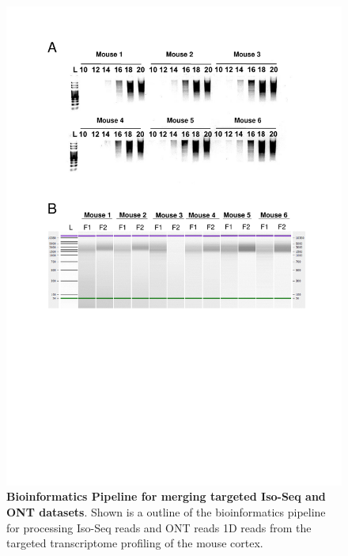 \begin{figure}[htp]
	\centering
	\includegraphics[page=5,trim={0.5cm 7cm 0cm 0cm},clip,scale = 0.8]{Figures/TargetedTranscriptome_LabResults}
	\captionsetup{width=0.95\textwidth,singlelinecheck=off}
	\caption[Bioinformatics Pipeline for merging targeted Iso-Seq and ONT datasets]%
	{\textbf{Bioinformatics Pipeline for merging targeted Iso-Seq and ONT datasets}. Shown is a outline of the bioinformatics pipeline for processing Iso-Seq reads and ONT reads 1D reads from the targeted transcriptome profiling of the mouse cortex. 
	}
	\label{fig:Targeted_bioinformatics_pipeline}
\end{figure}

\newpage
